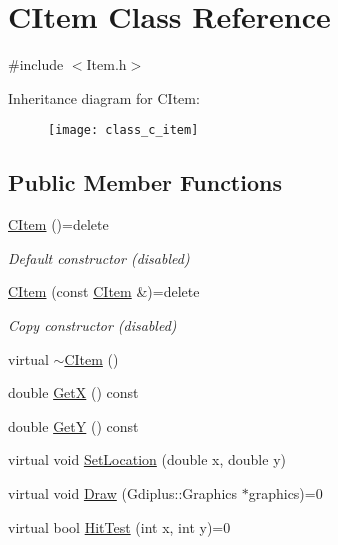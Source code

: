 \hypertarget{class_c_item}{}\section{C\+Item Class Reference}
\label{class_c_item}


{\ttfamily \#include $<$Item.\+h$>$}

Inheritance diagram for C\+Item\+:\begin{figure}[H]
\begin{center}
\leavevmode
\texttt{[image: class\_c\_item]}
\end{center}
\end{figure}
\subsection*{Public Member Functions}
\begin{DoxyCompactItemize}
\item 
\mbox{\label{class_c_item_ac2ea847c008cf8d1de92c870c8f8262f}} 
\mbox{\hyperlink{class_c_item_ac2ea847c008cf8d1de92c870c8f8262f}{C\+Item}} ()=delete
\begin{DoxyCompactList}\small\item\em Default constructor (disabled) \end{DoxyCompactList}\item 
\mbox{\label{class_c_item_a7d6042bbb9a571d2dc1d1f89016a97c8}} 
\mbox{\hyperlink{class_c_item_a7d6042bbb9a571d2dc1d1f89016a97c8}{C\+Item}} (const \mbox{\hyperlink{class_c_item}{C\+Item}} \&)=delete
\begin{DoxyCompactList}\small\item\em Copy constructor (disabled) \end{DoxyCompactList}\item 
virtual \mbox{\hyperlink{class_c_item_a2487c6e822ed0e850544f1745b43f584}{$\sim$\+C\+Item}} ()
\item 
double \mbox{\hyperlink{class_c_item_a394d38a058fc53f0e958ca52248560c8}{GetX}} () const
\item 
double \mbox{\hyperlink{class_c_item_ac0fe6be80f8ef19854d7f41b4803f658}{GetY}} () const
\item 
virtual void \mbox{\hyperlink{class_c_item_a5b76e510670afffe0d1da6bcc6c14547}{Set\+Location}} (double x, double y)
\item 
virtual void \mbox{\hyperlink{class_c_item_a7ef8448d0c4bc53d0f1943a4dc817f6f}{Draw}} (Gdiplus\+::\+Graphics $\ast$graphics)=0
\item 
virtual bool \mbox{\hyperlink{class_c_item_a8bd4f5e3f2eb2487125dd435719484e8}{Hit\+Test}} (int x, int y)=0
\end{DoxyCompactItemize}
